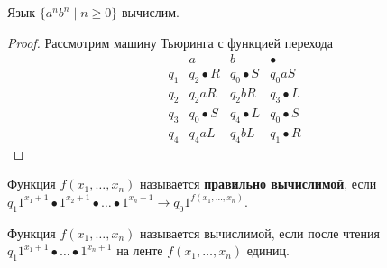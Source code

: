 \begin{statement}
Язык $\{ a^n b^n \mid n \geqslant 0 \}$ вычислим.
\end{statement}
\begin{proof}
Рассмотрим машину Тьюринга с функцией перехода
\begin{equation*}
\begin{matrix}
  & a & b & \bullet \\
q_1 & q_2 \bullet R & q_0 \bullet S & q_0 a S \\
q_2 & q_2 a R & q_2 b R & q_3 \bullet L \\
q_3 & q_0 \bullet S & q_4 \bullet L & q_0 \bullet S \\
q_4 & q_4 a L & q_4 b L & q_1 \bullet R
\end{matrix}
\end{equation*}
\end{proof}

Функция $f(x_1, \ldots, x_n)$ называется \textbf{правильно вычислимой}, если $q_1 1^{x_1 + 1} \bullet 1^{x_2 + 1} \bullet \ldots \bullet 1^{x_n + 1} \to q_0 1^{f(x_1, \ldots, x_n)}$.

Функция $f(x_1, \ldots, x_n)$ называется вычислимой, если после чтения $q_1 1^{x_1 + 1} \bullet \ldots \bullet 1^{x_n + 1}$ на ленте $f(x_1, \ldots, x_n)$ единиц.